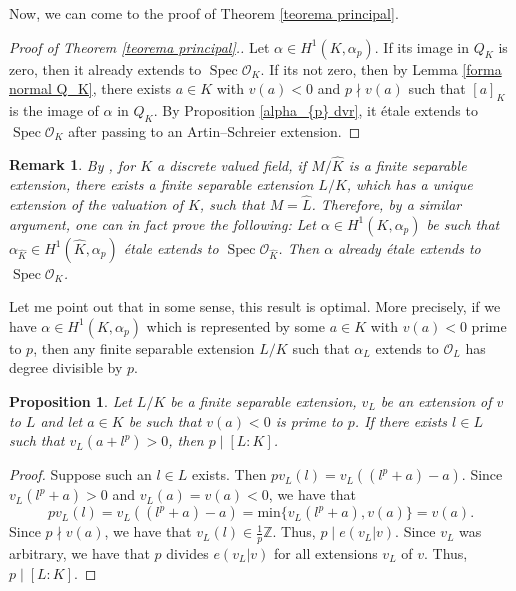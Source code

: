 \documentclass[a4paper,english,12pt]{amsart}
\newtheorem{proposition}[definition]{Proposition}
\newtheorem{remark}[definition]{Remark}
\numberwithin{equation}{section}
\DeclareMathOperator{\Spec}{Spec}
\renewcommand{\_}{\rule{0.25cm}{0.4pt}}
\begin{document}
Now, we can come to the proof of Theorem \ref{teorema principal}.

\begin{proof}[Proof of Theorem \ref{teorema principal}.]
    Let $\alpha\in H^{1}(K,\alpha_{p})$. If its image in $Q_{K}$ is zero, then it already extends to $\Spec \mathcal{O}_{K}$. If its not zero, then by Lemma \ref{forma normal Q_K}, there exists $a\in K$ with $v(a)<0$ and $p\nmid v(a)$ such that $[a]_{K}$ is the image of $\alpha$ in $Q_{K}$. By Proposition \ref{alpha_{p} dvr}, it étale extends to $\Spec \mathcal{O}_{K}$ after passing to an Artin--Schreier extension.
\end{proof}

\begin{remark}
    By \cite[\href{https://stacks.math.columbia.edu/tag/09EJ}{Tag 09EJ}]{stacks-project}, for $K$ a discrete valued field, if $M/\widehat{K}$ is a finite separable extension, there exists a finite separable extension $L/K$, which has a unique extension of the valuation of $K$, such that $M=\widehat{L}$.
    Therefore, by a similar argument, one can in fact prove the following: Let $\alpha\in H^{1}(K,\alpha_{p})$ be such that $\alpha_{\widehat{K}}\in H^{1}(\widehat{K},\alpha_{p})$ étale extends to $\Spec \mathcal{O}_{\widehat{K}}$. Then $\alpha$ already étale extends to $\Spec \mathcal{O}_{K}$.
\end{remark}

Let me point out that in some sense, this result is optimal. More precisely, if we have $\alpha\in H^{1}(K,\alpha_{p})$ which is represented by some $a\in K$ with $v(a)<0$ prime to $p$, then any finite separable extension $L/K$ such that $\alpha_{L}$ extends to $\mathcal{O}_{L}$ has degree divisible by $p$.

\begin{proposition}
    Let $L/K$ be a finite separable extension, $v_{L}$ be an extension of $v$ to $L$ and let $a\in K$ be such that $v(a)<0$ is prime to $p$. If there exists $l\in L$ such that $v_{L}(a+l^{p})>0$, then $p\mid [L\colon K]$. 
\end{proposition}
\begin{proof}
    Suppose such an $l\in L$ exists. Then $p v_{L}(l)=v_{L}((l^{p}+a)-a)$. Since $v_{L}(l^{p}+a)>0$ and $v_{L}(a)=v(a)<0$, we have that
    \[
    p v_{L}(l)=v_{L}((l^{p}+a)-a)=\text{min}\{v_{L}(l^{p}+a),v(a)\}=v(a).
    \]
    Since $p\nmid v(a)$, we have that $v_{L}(l)\in \frac{1}{p}\mathbb{Z}$. Thus, $p\mid e(v_{L}| v)$. Since $v_{L}$ was arbitrary, we have that $p$ divides $e(v_{L}| v)$ for all extensions $v_{L}$ of $v$. Thus, $p\mid [L\colon K]$.
\end{proof}
\end{document}
